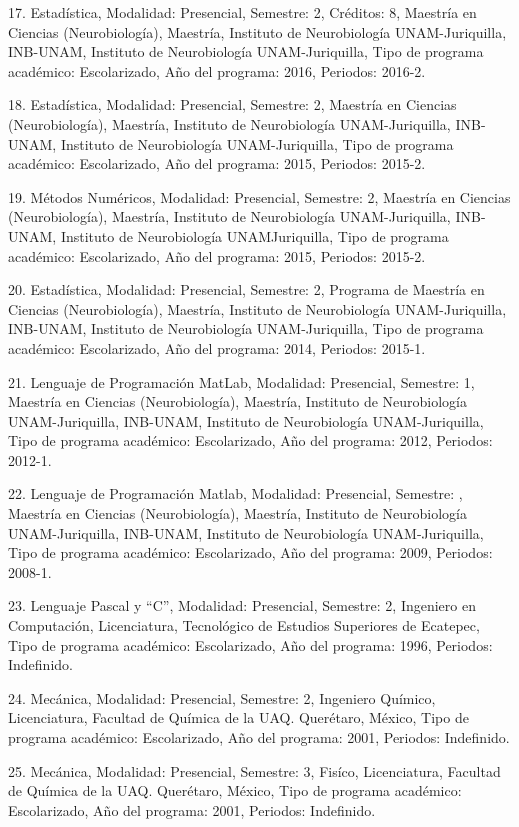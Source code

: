 17. Estadística, Modalidad: Presencial, Semestre: 2, Créditos: 8, Maestría en Ciencias 
(Neurobiología), Maestría, Instituto de Neurobiología UNAM-Juriquilla, INB-UNAM, Instituto de 
Neurobiología UNAM-Juriquilla, Tipo de programa académico: Escolarizado, Año del programa: 2016, 
Periodos: 2016-2.

18. Estadística, Modalidad: Presencial, Semestre: 2, Maestría en Ciencias (Neurobiología), Maestría, 
Instituto de Neurobiología UNAM-Juriquilla, INB-UNAM, Instituto de Neurobiología UNAM-Juriquilla, 
Tipo de programa académico: Escolarizado, Año del programa: 2015, Periodos: 2015-2.

19. Métodos Numéricos, Modalidad: Presencial, Semestre: 2, Maestría en Ciencias (Neurobiología), 
Maestría, Instituto de Neurobiología UNAM-Juriquilla, INB-UNAM, Instituto de Neurobiología 
UNAMJuriquilla, Tipo de programa académico: Escolarizado, Año del programa: 2015, Periodos: 2015-2.

20. Estadística, Modalidad: Presencial, Semestre: 2, Programa de Maestría en Ciencias 
(Neurobiología), Maestría, Instituto de Neurobiología UNAM-Juriquilla, INB-UNAM, Instituto de 
Neurobiología UNAM-Juriquilla, Tipo de programa académico: Escolarizado, Año del programa: 2014, 
Periodos: 2015-1.

21. Lenguaje de Programación MatLab, Modalidad: Presencial, Semestre: 1, Maestría en Ciencias 
(Neurobiología), Maestría, Instituto de Neurobiología UNAM-Juriquilla, INB-UNAM, Instituto de 
Neurobiología UNAM-Juriquilla, Tipo de programa académico: Escolarizado, Año del programa: 2012, 
Periodos: 2012-1.

22. Lenguaje de Programación Matlab, Modalidad: Presencial, Semestre: , Maestría en Ciencias 
(Neurobiología), Maestría, Instituto de Neurobiología UNAM-Juriquilla, INB-UNAM, Instituto de 
Neurobiología UNAM-Juriquilla, Tipo de programa académico: Escolarizado, Año del programa: 2009, 
Periodos: 2008-1.

23. Lenguaje Pascal y “C”, Modalidad: Presencial, Semestre: 2, Ingeniero en Computación, 
Licenciatura, Tecnológico de Estudios Superiores de Ecatepec, Tipo de programa académico: 
Escolarizado, Año del programa: 1996, Periodos: Indefinido.

24. Mecánica, Modalidad: Presencial, Semestre: 2, Ingeniero Químico, Licenciatura, Facultad de 
Química de la UAQ. Querétaro, México, Tipo de programa académico: Escolarizado, Año del programa: 
2001, Periodos: Indefinido.

25. Mecánica, Modalidad: Presencial, Semestre: 3, Fisíco, Licenciatura, Facultad de Química de la 
UAQ. Querétaro, México, Tipo de programa académico: Escolarizado, Año del programa: 2001, Periodos: 
Indefinido.

